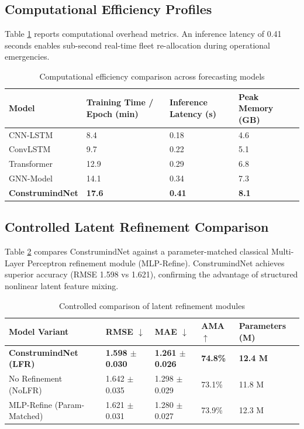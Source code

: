 \documentclass[pdflatex,sn-mathphys,Numbered]{sn-jnl}%
\begin{document}
\subsection{Computational Efficiency Profiles}
Table \ref{tab10} reports computational overhead metrics. An inference latency of 0.41 seconds enables sub-second real-time fleet re-allocation during operational emergencies.

\begin{table}[h]
\caption{Computational efficiency comparison across forecasting models}\label{tab10}
\begin{tabular}{@{}llll@{}}
\toprule
Model & Training Time / Epoch (min) & Inference Latency (s) & Peak Memory (GB) \\
\midrule
CNN-LSTM & 8.4 & 0.18 & 4.6 \\
ConvLSTM & 9.7 & 0.22 & 5.1 \\
Transformer & 12.9 & 0.29 & 6.8 \\
GNN-Model & 14.1 & 0.34 & 7.3 \\
\textbf{ConstrumindNet} & \textbf{17.6} & \textbf{0.41} & \textbf{8.1} \\
\bottomrule
\end{tabular}
\end{table}

\subsection{Controlled Latent Refinement Comparison}
Table \ref{tab11} compares ConstrumindNet against a parameter-matched classical Multi-Layer Perceptron refinement module (MLP-Refine). ConstrumindNet achieves superior accuracy (RMSE 1.598 vs 1.621), confirming the advantage of structured nonlinear latent feature mixing.

\begin{table}[h]
\caption{Controlled comparison of latent refinement modules}\label{tab11}
\begin{tabular}{@{}lllll@{}}
\toprule
Model Variant & RMSE $\downarrow$ & MAE $\downarrow$ & AMA $\uparrow$ & Parameters (M) \\
\midrule
\textbf{ConstrumindNet (LFR)} & \textbf{1.598 $\pm$ 0.030} & \textbf{1.261 $\pm$ 0.026} & \textbf{74.8\%} & \textbf{12.4 M} \\
No Refinement (NoLFR) & 1.642 $\pm$ 0.035 & 1.298 $\pm$ 0.029 & 73.1\% & 11.8 M \\
MLP-Refine (Param-Matched) & 1.621 $\pm$ 0.031 & 1.280 $\pm$ 0.027 & 73.9\% & 12.3 M \\
\bottomrule
\end{tabular}
\end{table}
\end{document}

